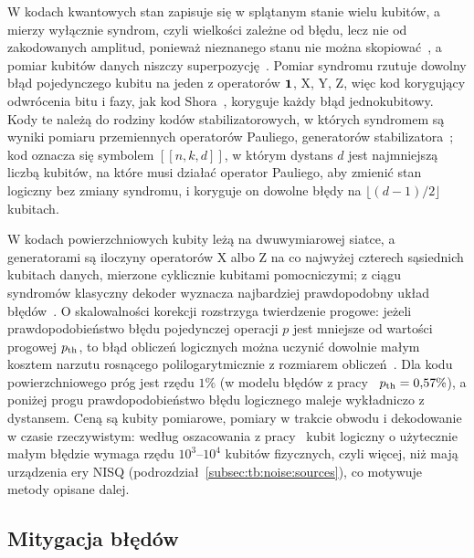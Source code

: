 W kodach kwantowych stan zapisuje się w splątanym stanie wielu kubitów, a mierzy wyłącznie syndrom, czyli wielkości zależne od błędu, lecz nie od zakodowanych amplitud, ponieważ nieznanego stanu nie można skopiować~\cite{wootters_single_1982}, a pomiar kubitów danych niszczy superpozycję~\cite{NielsenChuang2010,bib:error_corr_intr}.
Pomiar syndromu rzutuje dowolny błąd pojedynczego kubitu na jeden z operatorów $\mathbf{1}$, $\mathrm{X}$, $\mathrm{Y}$, $\mathrm{Z}$, więc kod korygujący odwrócenia bitu i fazy, jak kod Shora~\cite{bib:shor_code}, koryguje każdy błąd jednokubitowy.
Kody te należą do rodziny kodów stabilizatorowych, w których syndromem są wyniki pomiaru przemiennych operatorów Pauliego, generatorów stabilizatora~\cite{gottesman_stabilizer_1997}; kod oznacza się symbolem $[[n,k,d]]$, w którym dystans $d$ jest najmniejszą liczbą kubitów, na które musi działać operator Pauliego, aby zmienić stan logiczny bez zmiany syndromu, i koryguje on dowolne błędy na $\lfloor(d-1)/2\rfloor$ kubitach.

W kodach powierzchniowych kubity leżą na dwuwymiarowej siatce, a generatorami są iloczyny operatorów $\mathrm{X}$ albo $\mathrm{Z}$ na co najwyżej czterech sąsiednich kubitach danych, mierzone cyklicznie kubitami pomocniczymi; z ciągu syndromów klasyczny dekoder wyznacza najbardziej prawdopodobny układ błędów~\cite{kitaev_fault-tolerant_2003,bib:surface_codes_fowler}.
O skalowalności korekcji rozstrzyga twierdzenie progowe: jeżeli prawdopodobieństwo błędu pojedynczej operacji $p$ jest mniejsze od wartości progowej $p_{\mathrm{th}}$, to błąd obliczeń logicznych można uczynić dowolnie małym kosztem narzutu rosnącego polilogarytmicznie z rozmiarem obliczeń~\cite{aharonov_fault-tolerant_2008,knill_resilient_1998,NielsenChuang2010}.
Dla kodu powierzchniowego próg jest rzędu $1\%$ (w modelu błędów z pracy~\cite{bib:surface_codes_fowler} $p_{\mathrm{th}}=0{,}57\%$), a poniżej progu prawdopodobieństwo błędu logicznego maleje wykładniczo z dystansem.
Ceną są kubity pomiarowe, pomiary w trakcie obwodu i dekodowanie w czasie rzeczywistym: według oszacowania z pracy~\cite{bib:surface_codes_fowler} kubit logiczny o użytecznie małym błędzie wymaga rzędu $10^3$--$10^4$ kubitów fizycznych, czyli więcej, niż mają urządzenia ery NISQ (podrozdział~\ref{subsec:tb:noise:sources}), co motywuje metody opisane dalej.

\subsection{Mitygacja błędów}\label{subsec:tb:qec:mitigation}

